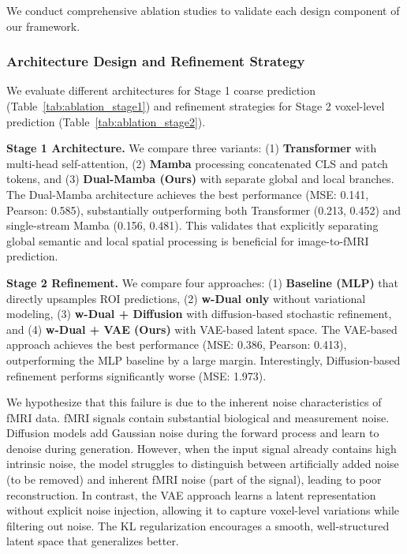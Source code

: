 We conduct comprehensive ablation studies to validate each design component of our framework.

\subsubsection{Architecture Design and Refinement Strategy}

We evaluate different architectures for Stage 1 coarse prediction (Table~\ref{tab:ablation_stage1})
and refinement strategies for Stage 2 voxel-level prediction (Table~\ref{tab:ablation_stage2}).

\textbf{Stage 1 Architecture.}
We compare three variants:
(1) \textbf{Transformer} with multi-head self-attention,
(2) \textbf{Mamba} processing concatenated CLS and patch tokens, and
(3) \textbf{Dual-Mamba (Ours)} with separate global and local branches.
The Dual-Mamba architecture achieves the best performance (MSE: 0.141, Pearson: 0.585),
substantially outperforming both Transformer (0.213, 0.452) and single-stream Mamba (0.156, 0.481).
This validates that explicitly separating global semantic and local spatial processing
is beneficial for image-to-fMRI prediction.

\textbf{Stage 2 Refinement.}
We compare four approaches:
(1) \textbf{Baseline (MLP)} that directly upsamples ROI predictions,
(2) \textbf{w-Dual only} without variational modeling,
(3) \textbf{w-Dual + Diffusion} with diffusion-based stochastic refinement, and
(4) \textbf{w-Dual + VAE (Ours)} with VAE-based latent space.
The VAE-based approach achieves the best performance (MSE: 0.386, Pearson: 0.413),
outperforming the MLP baseline by a large margin.
Interestingly, Diffusion-based refinement performs significantly worse (MSE: 1.973).

We hypothesize that this failure is due to the inherent noise characteristics of fMRI data.
fMRI signals contain substantial biological and measurement noise.
Diffusion models add Gaussian noise during the forward process and learn to denoise during generation.
However, when the input signal already contains high intrinsic noise,
the model struggles to distinguish between artificially added noise (to be removed)
and inherent fMRI noise (part of the signal), leading to poor reconstruction.
In contrast, the VAE approach learns a latent representation without explicit noise injection,
allowing it to capture voxel-level variations while filtering out noise.
The KL regularization encourages a smooth, well-structured latent space that generalizes better.

